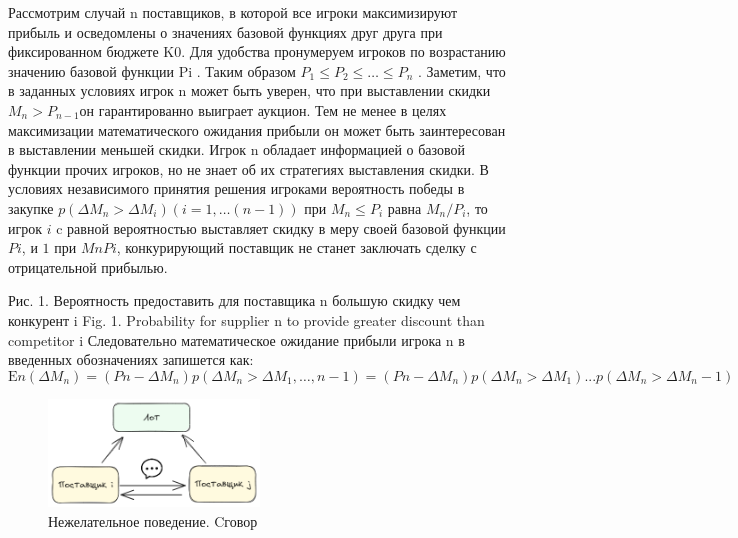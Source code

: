 Рассмотрим случай n поставщиков, в которой все игроки максимизируют прибыль и осведомлены о значениях базовой функциях друг друга при фиксированном бюджете K0. Для удобства пронумеруем игроков по возрастанию значению базовой функции Pi . Таким образом $P_1 \le P_2 \le \dots \le P_n$ .
Заметим, что в заданных условиях игрок n может быть уверен, что при выставлении скидки $M_{n} >P_{n-1}$он гарантированно выиграет аукцион. Тем не менее в целях максимизации математического ожидания прибыли он может быть заинтересован в выставлении меньшей скидки.
Игрок n обладает информацией о базовой функции прочих игроков, но не знает об их стратегиях выставления скидки. В условиях независимого принятия решения игроками вероятность победы в закупке $p(\Delta M_n > \Delta M_i) (i = 1, … (n-1))$ при $M_n \le P_i$ равна  $M_n/P_i$, то игрок $i$ c равной вероятностью 
выставляет скидку в меру своей базовой функции $Pi$, и $1$ при $MnPi$, конкурирующий поставщик не станет заключать сделку с отрицательной прибылью. 

Рис. 1. Вероятность предоставить для поставщика n большую скидку чем конкурент i
Fig. 1. Probability for supplier n to provide greater discount than competitor i
Следовательно математическое ожидание прибыли игрока n в введенных обозначениях запишется как:
\begin{equation}
	\mathrm{E} n(\Delta M_n) =(Pn-\Delta M_n)p(\Delta M_n>\Delta M_1,\dots,n-1)=
	(Pn-\Delta M_n)p(\Delta M_n >\Delta M_1)...p(\Delta M_n >\Delta M_n-1) 
\end{equation}


\begin{figure}[h]
    \centering
    \includegraphics[width=0.5\textwidth]{assets/settings/collusion.excalidraw.png}
    \caption{Нежелательное поведение. Cговор}
\end{figure}

